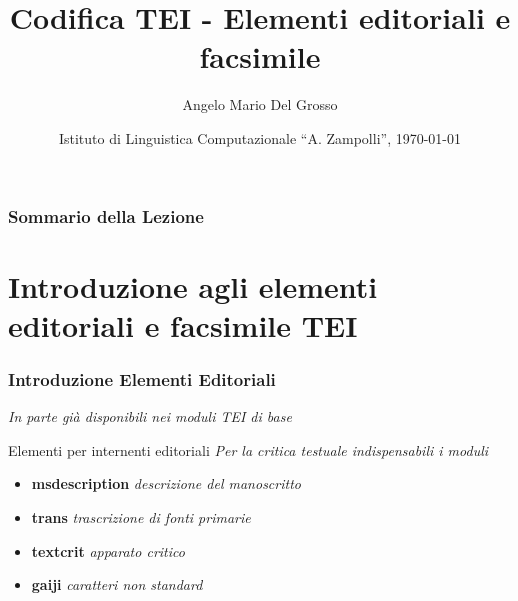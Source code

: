 \documentclass{beamer}
\title{Codifica TEI - Elementi editoriali e facsimile}
\author[A.M. Del Grosso]{Angelo Mario Del Grosso}
\institute{\texttt{angelo.delgrosso@ilc.cnr.it} \\\bigskip\textit{CNR-ILC-LicoLab} \\\bigskip\url{http://licolab.ilc.cnr.it/}}
\date{Istituto di Linguistica Computazionale ``A. Zampolli'', \today}
\begin{document}
    
    \begin{frame}
        \maketitle
    \end{frame}
    
    \begin{frame}
        \frametitle{Sommario della Lezione}
        \tableofcontents
    \end{frame}
    
    \section{Introduzione agli elementi editoriali e facsimile TEI}
    
    \begin{frame}
        \frametitle{Introduzione Elementi Editoriali}
        \addtocounter{nframe}{1}
        
        \textit{In parte già disponibili nei moduli TEI di base}

        \begin{block}{Elementi per internenti editoriali}
            \emph{Per la critica testuale indispensabili i moduli}
            \begin{itemize}
                \item \textbf{msdescription} \textit{descrizione del manoscritto} 
                \item \textbf{trans} \textit{trascrizione di fonti primarie }
                \item \textbf{textcrit} \textit{apparato critico}
                \item \textbf{gaiji} \textit{caratteri non standard}
            \end{itemize}
        \end{block}
        
    \end{frame}
    
\end{document}

